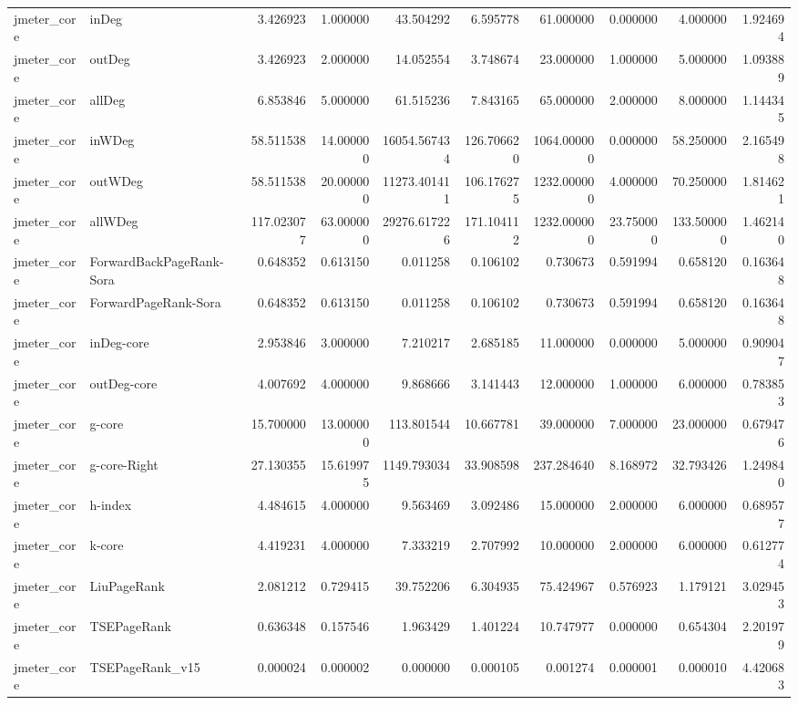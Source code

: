 \begin{tabular}{llrrrrrrrr}
jmeter_core & inDeg & 3.426923 & 1.000000 & 43.504292 & 6.595778 & 61.000000 & 0.000000 & 4.000000 & 1.924694 \\
jmeter_core & outDeg & 3.426923 & 2.000000 & 14.052554 & 3.748674 & 23.000000 & 1.000000 & 5.000000 & 1.093889 \\
jmeter_core & allDeg & 6.853846 & 5.000000 & 61.515236 & 7.843165 & 65.000000 & 2.000000 & 8.000000 & 1.144345 \\
jmeter_core & inWDeg & 58.511538 & 14.000000 & 16054.567434 & 126.706620 & 1064.000000 & 0.000000 & 58.250000 & 2.165498 \\
jmeter_core & outWDeg & 58.511538 & 20.000000 & 11273.401411 & 106.176275 & 1232.000000 & 4.000000 & 70.250000 & 1.814621 \\
jmeter_core & allWDeg & 117.023077 & 63.000000 & 29276.617226 & 171.104112 & 1232.000000 & 23.750000 & 133.500000 & 1.462140 \\
jmeter_core & ForwardBackPageRank-Sora & 0.648352 & 0.613150 & 0.011258 & 0.106102 & 0.730673 & 0.591994 & 0.658120 & 0.163648 \\
jmeter_core & ForwardPageRank-Sora & 0.648352 & 0.613150 & 0.011258 & 0.106102 & 0.730673 & 0.591994 & 0.658120 & 0.163648 \\
jmeter_core & inDeg-core & 2.953846 & 3.000000 & 7.210217 & 2.685185 & 11.000000 & 0.000000 & 5.000000 & 0.909047 \\
jmeter_core & outDeg-core & 4.007692 & 4.000000 & 9.868666 & 3.141443 & 12.000000 & 1.000000 & 6.000000 & 0.783853 \\
jmeter_core & g-core & 15.700000 & 13.000000 & 113.801544 & 10.667781 & 39.000000 & 7.000000 & 23.000000 & 0.679476 \\
jmeter_core & g-core-Right & 27.130355 & 15.619975 & 1149.793034 & 33.908598 & 237.284640 & 8.168972 & 32.793426 & 1.249840 \\
jmeter_core & h-index & 4.484615 & 4.000000 & 9.563469 & 3.092486 & 15.000000 & 2.000000 & 6.000000 & 0.689577 \\
jmeter_core & k-core & 4.419231 & 4.000000 & 7.333219 & 2.707992 & 10.000000 & 2.000000 & 6.000000 & 0.612774 \\
jmeter_core & LiuPageRank & 2.081212 & 0.729415 & 39.752206 & 6.304935 & 75.424967 & 0.576923 & 1.179121 & 3.029453 \\
jmeter_core & TSEPageRank & 0.636348 & 0.157546 & 1.963429 & 1.401224 & 10.747977 & 0.000000 & 0.654304 & 2.201979 \\
jmeter_core & TSEPageRank_v15 & 0.000024 & 0.000002 & 0.000000 & 0.000105 & 0.001274 & 0.000001 & 0.000010 & 4.420683 \\

\end{tabular}
